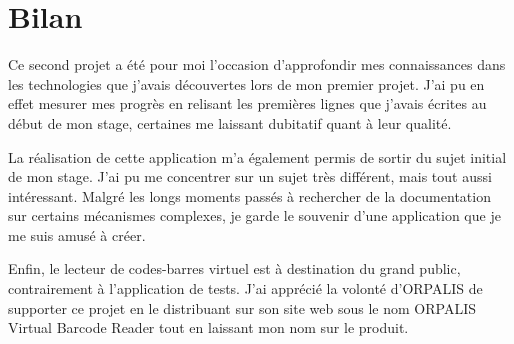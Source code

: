 \section{Bilan}

Ce second projet a été pour moi l'occasion d'approfondir mes connaissances dans les technologies que j'avais découvertes lors de mon premier projet. J'ai pu en effet mesurer mes progrès en relisant les premières lignes que j'avais écrites au début de mon stage, certaines me laissant dubitatif quant à leur qualité.

La réalisation de cette application m'a également permis de sortir du sujet initial de mon stage. J'ai pu me concentrer sur un sujet très différent, mais tout aussi intéressant. Malgré les longs moments passés à rechercher de la documentation sur certains mécanismes complexes, je garde le souvenir d'une application que je me suis amusé à créer.

Enfin, le lecteur de codes-barres virtuel est à destination du grand public, contrairement à l'application de tests. J'ai apprécié la volonté d'ORPALIS de supporter ce projet en le distribuant sur son site web sous le nom \og ORPALIS Virtual Barcode Reader \fg{} tout en laissant mon nom sur le produit.